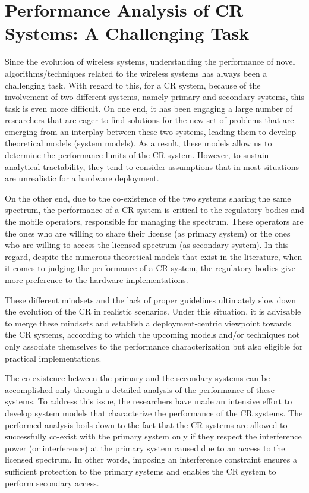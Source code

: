 \section{Performance Analysis of CR Systems: A Challenging Task}
\label{sec:PA}
Since the evolution of wireless systems, understanding the performance of novel algorithms/techniques related to the wireless systems has always been a challenging task. With regard to this, for a CR system, because of the involvement of two different systems, namely primary and secondary systems, this task is even more difficult. On one end, it has been engaging a large number of researchers that are eager to find solutions for the new set of problems that are emerging from an interplay between these two systems, leading them to develop theoretical models (system models). As a result, these models allow us to determine the performance limits of the CR system. However, to sustain analytical tractability, they tend to consider assumptions that in most situations are unrealistic for a hardware deployment.  %
 
On the other end, due to the co-existence of the two systems sharing the same spectrum, the performance of a CR system is critical to the regulatory bodies and the mobile operators, responsible for managing the spectrum. These operators are the ones who are willing to share their license (as primary system) or the ones who are willing to access the licensed spectrum (as secondary system). In this regard, despite the numerous theoretical models that exist in the literature, when it comes to judging the performance of a CR system, the regulatory bodies give more preference to the hardware implementations. 

These different mindsets and the lack of proper guidelines ultimately slow down the evolution of the CR in realistic scenarios. Under this situation, it is advisable to merge these mindsets and establish a deployment-centric viewpoint towards the CR systems, according to which the upcoming models and/or techniques not only associate themselves to the performance characterization but also eligible for practical implementations. %

The co-existence between the primary and the secondary systems can be accomplished only through a detailed analysis of the performance of these systems. %
To address this issue, the researchers have made an intensive effort to develop system models \cite{Liang08, Kang209, Kang09} that characterize the performance of the CR systems. The performed analysis boils down to the fact that the CR systems are allowed to successfully co-exist with the primary system only if they respect the interference power (or interference) at the primary system caused due to an access to the licensed spectrum. In other words, imposing an interference constraint ensures a sufficient protection to the primary systems and enables the CR system to perform secondary access.


